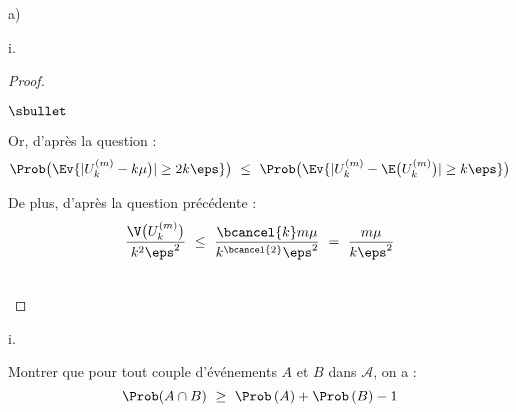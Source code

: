 \begin{liste}{a)}
\begin{nonoliste}{i.}
\begin{proof}
\begin{noliste}{$\sbullet$}
      \item Or, d'après la question  :
        \[
        \Prob\big( \Ev{|U_k^{(m)} - k \mu \big)| \geq 2 k \eps} \big) \
        \leq \ \Prob\big( \Ev{|U_k^{(m)} - \E\big( U_k^{(m)} \big)|
          \geq k \eps} \big)
        \]

      \item De plus, d'après la question précédente :
        \[
        \dfrac{\V\big(U_k^{(m)} \big)}{k^2 \eps^2} \ \leq \
        \dfrac{\bcancel{k} m \mu}{k^{\bcancel{2}} \eps^2} \ = \
        \dfrac{m \mu}{k \eps^2}
        \]
      \end{noliste}
      ~\\[-1.2cm]
    \end{proof}
  \end{nonoliste}

\item
  \begin{nonoliste}{i.}
  \item Montrer que pour tout couple d'événements $A$ et $B$ dans
    $\mathcal{A}$, on a :
    \[
    \Prob(A \cap B) \ \geq \  \Prob\left(A\right) + \Prob\left(B \right)-1
    \]


\end{nonoliste}
\end{liste}

